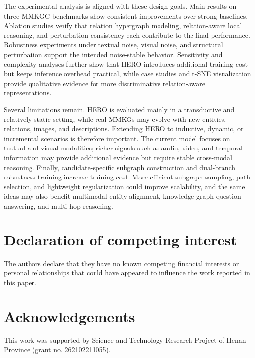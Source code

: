 \documentclass[a4paper,fleqn]{cas-sc}
\begin{document}
The experimental analysis is aligned with these design goals. Main results on three MMKGC benchmarks show consistent improvements over strong baselines. Ablation studies verify that relation hypergraph modeling, relation-aware local reasoning, and perturbation consistency each contribute to the final performance. Robustness experiments under textual noise, visual noise, and structural perturbation support the intended noise-stable behavior. Sensitivity and complexity analyses further show that HERO introduces additional training cost but keeps inference overhead practical, while case studies and t-SNE visualization provide qualitative evidence for more discriminative relation-aware representations.

Several limitations remain. HERO is evaluated mainly in a transductive and relatively static setting, while real MMKGs may evolve with new entities, relations, images, and descriptions. Extending HERO to inductive, dynamic, or incremental scenarios is therefore important. The current model focuses on textual and visual modalities; richer signals such as audio, video, and temporal information may provide additional evidence but require stable cross-modal reasoning. Finally, candidate-specific subgraph construction and dual-branch robustness training increase training cost. More efficient subgraph sampling, path selection, and lightweight regularization could improve scalability, and the same ideas may also benefit multimodal entity alignment, knowledge graph question answering, and multi-hop reasoning.



\printcredits

\section*{Declaration of competing interest}
The authors declare that they have no known competing financial
interests or personal relationships that could have appeared to influence
the work reported in this paper.


\section*{Acknowledgements}
This work was supported by Science and Technology Research Project of Henan Province (grant no. 262102211055).


%



\end{document}
